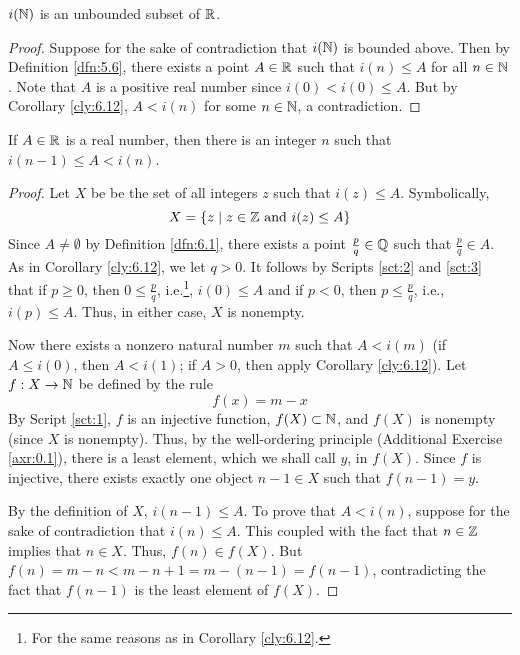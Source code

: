 \documentclass[../main.tex]{subfiles}
\begin{document}
\begin{corollary}\label{cly:6.13}
    $i(\mathbb{N})$ is an unbounded subset of $\mathbb{R}$.
    \begin{proof}
        Suppose for the sake of contradiction that $i(\mathbb{N})$ is bounded above. Then by Definition \ref{dfn:5.6}, there exists a point $A\in\mathbb{R}$ such that $i(n)\leq A$ for all $n\in\mathbb{N}$. Note that $A$ is a positive real number since $i(0)<i(0)\leq A$. But by Corollary \ref{cly:6.12}, $A<i(n)$ for some $n\in\mathbb{N}$, a contradiction.
    \end{proof}
\end{corollary}
\pagebreak

\begin{corollary}\label{cly:6.14}
    If $A\in\mathbb{R}$ is a real number, then there is an integer $n$ such that $i(n-1)\leq A<i(n)$.
    \begin{proof}
        Let $X$ be be the set of all integers $z$ such that $i(z)\leq A$. Symbolically,
        \begin{equation*}
            X = \{z\mid z\in\mathbb{Z}\text{ and }i(z)\leq A\}
        \end{equation*}
        Since $A\neq\emptyset$ by Definition \ref{dfn:6.1}, there exists a point $\frac{p}{q}\in\mathbb{Q}$ such that $\frac{p}{q}\in A$. As in Corollary \ref{cly:6.12}, we let $q>0$. It follows by Scripts \ref{sct:2} and \ref{sct:3} that if $p\geq 0$, then $0\leq\frac{p}{q}$, i.e.\footnote{For the same reasons as in Corollary \ref{cly:6.12}.}, $i(0)\leq A$ and if $p<0$, then $p\leq\frac{p}{q}$, i.e., $i(p)\leq A$. Thus, in either case, $X$ is nonempty.\par
        Now there exists a nonzero natural number $m$ such that $A<i(m)$ (if $A\leq i(0)$, then $A<i(1)$; if $A>0$, then apply Corollary \ref{cly:6.12}). Let $f:X\to\mathbb{N}$ be defined by the rule
        \begin{equation*}
            f(x) = m-x
        \end{equation*}
        By Script \ref{sct:1}, $f$ is an injective function, $f(X)\subset\mathbb{N}$, and $f(X)$ is nonempty (since $X$ is nonempty). Thus, by the well-ordering principle (Additional Exercise \ref{axr:0.1}), there is a least element, which we shall call $y$, in $f(X)$. Since $f$ is injective, there exists exactly one object $n-1\in X$ such that $f(n-1)=y$.\par
        By the definition of $X$, $i(n-1)\leq A$. To prove that $A<i(n)$, suppose for the sake of contradiction that $i(n)\leq A$. This coupled with the fact that $n\in\mathbb{Z}$ implies that $n\in X$. Thus, $f(n)\in f(X)$. But $f(n)=m-n<m-n+1=m-(n-1)=f(n-1)$, contradicting the fact that $f(n-1)$ is the least element of $f(X)$.
    \end{proof}
\end{corollary}
\end{document}
